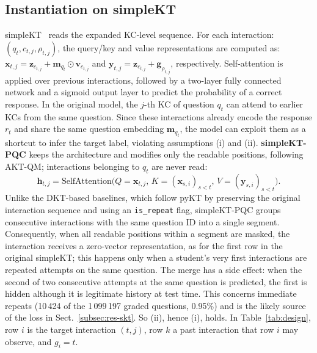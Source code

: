 \subsection{Instantiation on simpleKT}
\label{subsec:int-simpleKT}
simpleKT~\cite{DBLP:conf/iclr/0001L0H023} reads the expanded KC-level sequence. For each interaction: $(q_t,\allowbreak c_{t,j},\allowbreak \rho_{t,j})$, the query/key and value representations are computed as: $\mathbf{x}_{t,j}=\mathbf{z}_{c_{t,j}}+\mathbf{m}_{q_t}\odot\mathbf{v}_{c_{t,j}}$ and $\mathbf{y}_{t,j}=\mathbf{z}_{c_{t,j}}+\mathbf{g}_{\rho_{t,j}}$, respectively. Self-attention is applied over previous interactions, followed by a two-layer fully connected network and a sigmoid output layer to predict the probability of a correct response.
In the original model, the $j$-th KC of question $q_t$ can attend to earlier KCs from the same question. Since these interactions already encode the response $r_t$ and share the same question embedding $\mathbf{m}_{q_t}$, the model can exploit them as a shortcut to infer the target label, violating assumptions (i) and (ii).
\textbf{simpleKT-PQC} keeps the architecture and modifies only the readable positions, following AKT-QM; interactions belonging to $q_t$ are never read:
\begin{equation}
\mathbf{h}_{t,j}=\mathrm{SelfAttention}\big(Q=\mathbf{x}_{t,j},\,K=(\mathbf{x}_{s,i})_{s<t},\,V=(\mathbf{y}_{s,i})_{s<t}\big).
  \label{eq:skt-pqc}
\end{equation}
Unlike the DKT-based baselines, which follow pyKT by preserving the original interaction sequence and using an \texttt{is\_repeat} flag, simpleKT-PQC groups consecutive interactions with the same question ID into a single segment. Consequently, when all readable positions within a segment are masked, the interaction receives a zero-vector representation, as for the first row in the original simpleKT; this happens only when a student's very first interactions are repeated attempts on the same question.
The merge has a side effect: when the second of two consecutive attempts at the same question is predicted, the first is hidden although it is legitimate history at test time. This concerns immediate repeats (10\,424 of the 1\,099\,197 graded questions, 0.95\%) and is the likely source of the loss in Sect.~\ref{subsec:res-skt}.
So (ii), hence (i), holds.
In Table~\ref{tab:design}, row $i$ is the target interaction $(t,j)$, row $k$ a past interaction that row $i$ may observe, and $g_i=t$.

